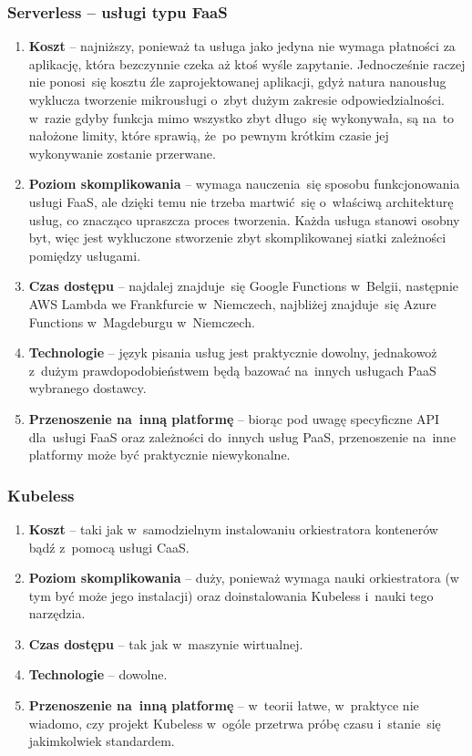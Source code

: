 \documentclass[12pt,a4paper,twoside,titlepage,openright]{book}
\begin{document}
\subsubsection{Serverless -- usługi typu FaaS}

\begin{enumerate}
	\item \textbf{Koszt} -- najniższy, ponieważ ta usługa jako jedyna nie wymaga płatności za aplikację, która bezczynnie czeka aż ktoś wyśle zapytanie. Jednocześnie raczej nie ponosi~się kosztu źle zaprojektowanej aplikacji, gdyż natura nanousług wyklucza tworzenie mikrousługi o~zbyt dużym zakresie odpowiedzialności. w~razie gdyby funkcja mimo wszystko zbyt długo~się wykonywała, są na~to nałożone limity, które sprawią, że~po pewnym krótkim czasie jej wykonywanie zostanie przerwane.
	\item \textbf{Poziom skomplikowania} -- wymaga nauczenia~się sposobu funkcjonowania usługi FaaS, ale dzięki temu nie trzeba martwić~się o~właściwą architekturę usług, co znacząco upraszcza proces tworzenia. Każda usługa stanowi osobny byt, więc jest wykluczone stworzenie zbyt skomplikowanej siatki zależności pomiędzy usługami.
	\item \textbf{Czas dostępu} -- najdalej znajduje~się Google Functions w~Belgii, następnie  AWS Lambda we Frankfurcie w~Niemczech, najbliżej znajduje~się Azure Functions w~Magdeburgu w~Niemczech.
	\item \textbf{Technologie} -- język pisania usług jest praktycznie dowolny, jednakowoż z~dużym prawdopodobieństwem będą bazować na~innych usługach PaaS wybranego dostawcy.
	\item \textbf{Przenoszenie na~inną platformę} -- biorąc pod uwagę specyficzne API dla~usługi FaaS oraz zależności do~innych usług PaaS, przenoszenie na~inne platformy może być praktycznie niewykonalne.
\end{enumerate}

\subsubsection{Kubeless}

\begin{enumerate}
	\item \textbf{Koszt} -- taki jak w~samodzielnym instalowaniu orkiestratora kontenerów bądź z~pomocą usługi CaaS.
	\item \textbf{Poziom skomplikowania} -- duży, ponieważ wymaga nauki orkiestratora (w tym być może jego instalacji) oraz doinstalowania Kubeless i~nauki tego narzędzia.
	\item \textbf{Czas dostępu} -- tak jak w~maszynie wirtualnej.
	\item \textbf{Technologie} -- dowolne.
	\item \textbf{Przenoszenie na~inną platformę} -- w~teorii łatwe, w~praktyce nie wiadomo, czy projekt Kubeless w~ogóle przetrwa próbę czasu i~stanie~się jakimkolwiek standardem.
\end{enumerate}
\end{document}

